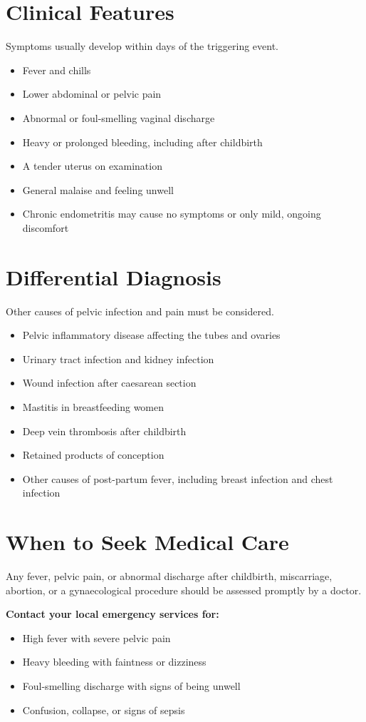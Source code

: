 \section*{Clinical Features}
Symptoms usually develop within days of the triggering event.
\begin{itemize}
    \item Fever and chills
    \item Lower abdominal or pelvic pain
    \item Abnormal or foul-smelling vaginal discharge
    \item Heavy or prolonged bleeding, including after childbirth
    \item A tender uterus on examination
    \item General malaise and feeling unwell
    \item Chronic endometritis may cause no symptoms or only mild, ongoing discomfort
\end{itemize}

\section*{Differential Diagnosis}
Other causes of pelvic infection and pain must be considered.
\begin{itemize}
    \item Pelvic inflammatory disease affecting the tubes and ovaries
    \item Urinary tract infection and kidney infection
    \item Wound infection after caesarean section
    \item Mastitis in breastfeeding women
    \item Deep vein thrombosis after childbirth
    \item Retained products of conception
    \item Other causes of post-partum fever, including breast infection and chest infection
\end{itemize}

\section*{When to Seek Medical Care}
Any fever, pelvic pain, or abnormal discharge after childbirth, miscarriage, abortion, or a gynaecological procedure should be assessed promptly by a doctor.

\textbf{Contact your local emergency services for:}
\begin{itemize}
    \item High fever with severe pelvic pain
    \item Heavy bleeding with faintness or dizziness
    \item Foul-smelling discharge with signs of being unwell
    \item Confusion, collapse, or signs of sepsis
\end{itemize}

